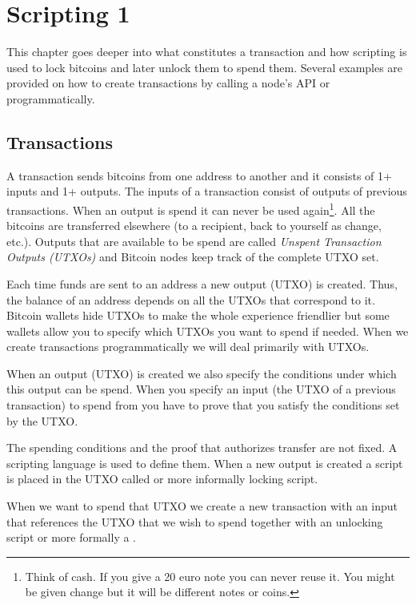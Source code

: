 \chapter{Scripting 1}

\begin{summary}
This chapter goes deeper into what constitutes a transaction and how scripting is used to lock bitcoins and later unlock them to spend them. Several examples are provided on how to create transactions by calling a node’s API or programmatically.
\end{summary}

\section{Transactions}

A transaction sends bitcoins from one address to another and it consists of 1+ inputs and 1+ outputs. The inputs of a transaction consist of outputs of previous transactions. When an output is spend it can never be used again\footnote{Think of cash. If you give a 20 euro note you can never reuse it. You might be given change but it will be different notes or coins.}. All the bitcoins are transferred elsewhere (to a recipient, back to yourself as change, etc.). Outputs that are available to be spend are called \emph{Unspent Transaction Outputs (UTXOs)} and Bitcoin nodes keep track of the complete UTXO set.

\begin{note}
Each time funds are sent to an address a new output (UTXO) is created. Thus, the balance of an address depends on all the UTXOs that correspond to it. Bitcoin wallets hide UTXOs to make the whole experience friendlier but some wallets allow you to specify which UTXOs you want to spend if needed. When we create transactions programmatically we will deal primarily with UTXOs.
\end{note}

When an output (UTXO) is created we also specify the conditions under which this output can be spend. When you specify an input (the UTXO of a previous transaction) to spend from you have to prove that you satisfy the conditions set by the UTXO.

The spending conditions and the proof that authorizes transfer are not fixed. A scripting language is used to define them. When a new output is created a script is placed in the UTXO called  or more informally locking script.

When we want to spend that UTXO we create a new transaction with an input that references the UTXO that we wish to spend together with an unlocking script or more formally a .

